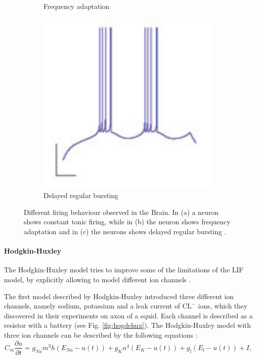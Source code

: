 \begin{figure}
\begin{subfigure}[t]{.32\textwidth}
  		\caption{Frequency adaptation}
	\end{subfigure}
	\begin{subfigure}[t]{.32\textwidth}
	 	\centering
  		\includegraphics[width=.9\linewidth]{imgs/lif_bad3.png}
  		\caption{Delayed regular bursting}
	\end{subfigure}
    \caption{Different firing behaviour observed in the Brain. In (a) a neuron shows constant tonic firing, while in (b) the neuron shows frequency adaptation and in (c) the neurons shows delayed regular bursting \cite{gerstner2014neuronal}.}
	\label{fig:neuronbe}
\end{figure}



\paragraph{Hodgkin-Huxley}

The Hodgkin-Huxley model tries to improve some of the limitations of the LIF model, by explicitly allowing to model different ion channels \cite{Hodgkin1952}\cite{gerstner2014neuronal}. 

The first model described by Hodgkin-Huxley introduced three different ion channels, namely sodium, potassium and a leak current of $\text{CL}^{-}$ ions, which they discovered in their experiments on axon of a squid.
Each channel is described as a resistor with a battery (see Fig. \ref{fig:hogdehux}).
The Hodgkin-Huxley model with three ion channels can be described by the following equations :
\[
C_m \frac{\partial u}{\partial t} = g_{Na} m^3 h (E_{Na} - u(t)) + g_K n^4 (E_K - u(t)) + g_l (E_l - u(t)) + I,
\]

